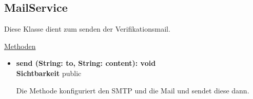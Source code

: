 \newpage
\subsection{MailService}\label{MailService}
Diese Klasse dient zum senden der Verifikationsmail.


\underline{Methoden}
\begin{itemize}
\itemsep0pt
\item \textbf{send (String: to, String: content): void}\hfill\\
\textbf{Sichtbarkeit} public

Die Methode konfiguriert den SMTP und die Mail und sendet diese dann.

\end{itemize}